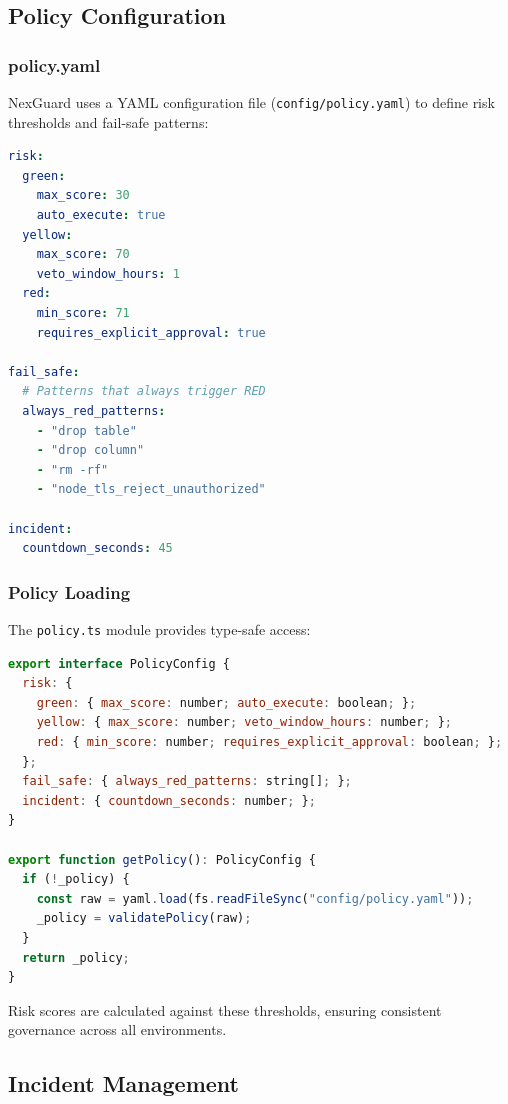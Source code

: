 \documentclass[11pt,a4paper]{article}
\begin{document}
\subsection{Policy Configuration}

\subsubsection{policy.yaml}
NexGuard uses a YAML configuration file (\texttt{config/policy.yaml}) to define risk thresholds and fail-safe patterns:

\begin{lstlisting}[language=yaml,caption=Policy Configuration (policy.yaml)]
risk:
  green:
    max_score: 30
    auto_execute: true
  yellow:
    max_score: 70
    veto_window_hours: 1
  red:
    min_score: 71
    requires_explicit_approval: true

fail_safe:
  # Patterns that always trigger RED
  always_red_patterns:
    - "drop table"
    - "drop column"
    - "rm -rf"
    - "node_tls_reject_unauthorized"

incident:
  countdown_seconds: 45
\end{lstlisting}

\subsubsection{Policy Loading}
The \texttt{policy.ts} module provides type-safe access:

\begin{lstlisting}[language=JavaScript,caption=Policy Service (config/policy.ts)]
export interface PolicyConfig {
  risk: {
    green: { max_score: number; auto_execute: boolean; };
    yellow: { max_score: number; veto_window_hours: number; };
    red: { min_score: number; requires_explicit_approval: boolean; };
  };
  fail_safe: { always_red_patterns: string[]; };
  incident: { countdown_seconds: number; };
}

export function getPolicy(): PolicyConfig {
  if (!_policy) {
    const raw = yaml.load(fs.readFileSync("config/policy.yaml"));
    _policy = validatePolicy(raw);
  }
  return _policy;
}
\end{lstlisting}

Risk scores are calculated against these thresholds, ensuring consistent governance across all environments.

\subsection{Incident Management}
\end{document}
